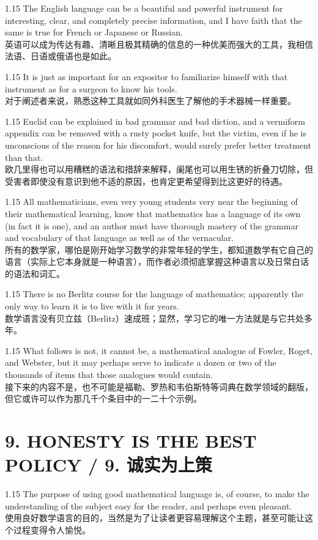 \documentclass[12pt,a4paper]{article}
\newcommand{\bilingual}[2]{
    \begin{spacing}{1.15} %
        \noindent \normalsize #1 \\[-0.5ex] %
        \small \textcolor{blue!70!black}{#2} %
    \end{spacing}
    \vspace{0.8em} %
}
\begin{document}
\bilingual{The English language can be a beautiful and powerful instrument for interesting, clear, and completely precise information, and I have faith that the same is true for French or Japanese or Russian.}
{英语可以成为传达有趣、清晰且极其精确的信息的一种优美而强大的工具，我相信法语、日语或俄语也是如此。} %

\bilingual{It is just as important for an expositor to familiarize himself with that instrument as for a surgeon to know his tools.}
{对于阐述者来说，熟悉这种工具就如同外科医生了解他的手术器械一样重要。} %

\bilingual{Euclid can be explained in bad grammar and bad diction, and a vermiform appendix can be removed with a rusty pocket knife, but the victim, even if he is unconscious of the reason for his discomfort, would surely prefer better treatment than that.}
{欧几里得也可以用糟糕的语法和措辞来解释，阑尾也可以用生锈的折叠刀切除，但受害者即使没有意识到他不适的原因，也肯定更希望得到比这更好的待遇。} %

\bilingual{All mathematicians, even very young students very near the beginning of their mathematical learning, know that mathematics has a language of its own (in fact it is one), and an author must have thorough mastery of the grammar and vocabulary of that language as well as of the vernacular.}
{所有的数学家，哪怕是刚开始学习数学的非常年轻的学生，都知道数学有它自己的语言（实际上它本身就是一种语言），而作者必须彻底掌握这种语言以及日常白话的语法和词汇。} %

\bilingual{There is no Berlitz course for the language of mathematics; apparently the only way to learn it is to live with it for years.}
{数学语言没有贝立兹（Berlitz）速成班；显然，学习它的唯一方法就是与它共处多年。} %

\bilingual{What follows is not, it cannot be, a mathematical analogue of Fowler, Roget, and Webster, but it may perhaps serve to indicate a dozen or two of the thousands of items that those analogues would contain.}
{接下来的内容不是，也不可能是福勒、罗热和韦伯斯特等词典在数学领域的翻版，但它或许可以作为那几千个条目中的一二十个示例。} %

\section*{9. HONESTY IS THE BEST POLICY / 9. 诚实为上策} %

\bilingual{The purpose of using good mathematical language is, of course, to make the understanding of the subject easy for the reader, and perhaps even pleasant.}
{使用良好数学语言的目的，当然是为了让读者更容易理解这个主题，甚至可能让这个过程变得令人愉悦。} %
\end{document}

